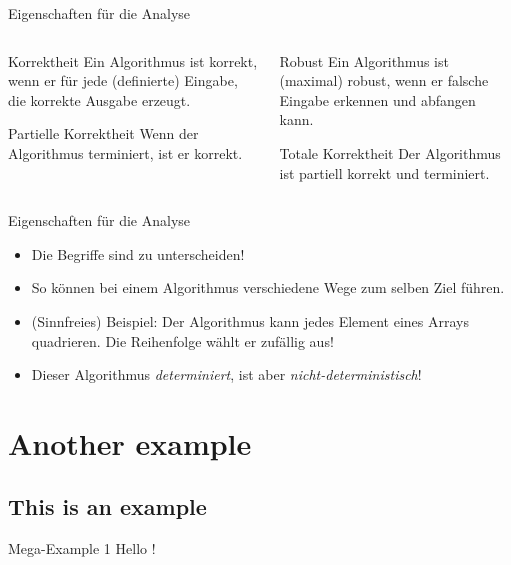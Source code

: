 \documentclass[aspectratio=169,usepdftitle=true]{beamer}
\newcommand\twosplit[3][t]{%
\begin{columns}[#1]
\begin{column}{0.475\linewidth}#2\end{column}\hfill
\begin{column}{0.475\linewidth}#3\end{column}
\end{columns}}
\begin{document}
\begin{frame}[c]{Eigenschaften für die Analyse}
    \twosplit{%
    \begin{block}{Korrektheit}
        Ein Algorithmus ist korrekt, wenn er für jede (definierte) Eingabe, die korrekte Ausgabe erzeugt.
    \end{block}
    \begin{block}{Partielle Korrektheit}
        Wenn der Algorithmus terminiert, ist er korrekt.
    \end{block}
    }{%
    \begin{block}{Robust}
        Ein Algorithmus ist (maximal) robust, wenn er falsche Eingabe erkennen und abfangen kann.
    \end{block}
    \begin{block}{Totale Korrektheit}
        Der Algorithmus ist partiell korrekt und terminiert.
    \end{block}
    }
\end{frame}

\begin{frame}{Eigenschaften für die Analyse}
    \begin{itemize}
        \item Die Begriffe sind zu unterscheiden!
        \item So können bei einem Algorithmus verschiedene Wege zum selben Ziel führen.
        \item (Sinnfreies) Beispiel: Der Algorithmus kann jedes Element eines Arrays quadrieren. Die Reihenfolge wählt er zufällig aus!
        \item Dieser Algorithmus \emph{determiniert}, ist aber \emph{nicht-deterministisch}!
    \end{itemize}
\end{frame}


\section{Another example}
\subsection{This is an example}

\begin{frame}{Mega-Example 1}
    Hello \cite{knuth-fa}!
\end{frame}
\end{document}

